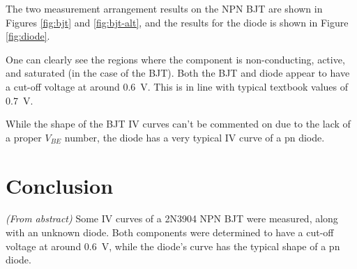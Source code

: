 \documentclass[a4paper]{scrartcl}
\begin{document}
The two measurement arrangement results on the NPN BJT are shown in Figures \ref{fig:bjt} and \ref{fig:bjt-alt}, and the results for the diode is shown in Figure \ref{fig:diode}.

One can clearly see the regions where the component is non-conducting, active, and saturated (in the case of the BJT). Both the BJT and diode appear to have a cut-off voltage at around \SI{0.6}{\volt}. This is in line with typical textbook values of \SI{0.7}{\volt}.

While the shape of the BJT IV curves can't be commented on due to the lack of a proper \(V_{BE}\) number, the diode has a very typical IV curve of a pn diode.

\section{Conclusion}
\emph{(From abstract)} Some IV curves of a 2N3904 NPN BJT were measured, along with an unknown diode. Both components were determined to have a cut-off voltage at around \SI{0.6}{\volt}, while the diode's curve has the typical shape of a pn diode.
\end{document}
